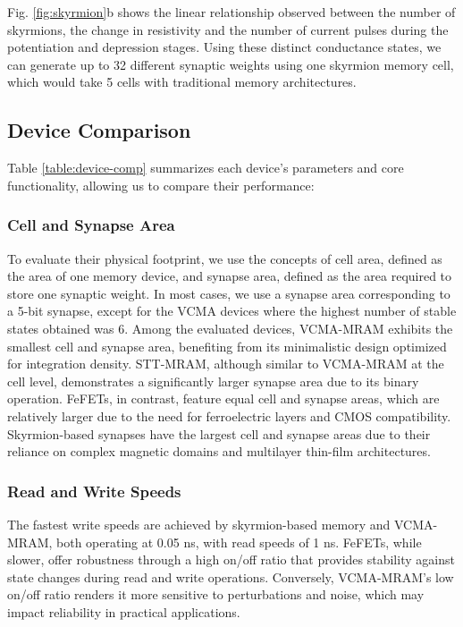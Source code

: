 \documentclass[conference]{IEEEtran}
\begin{document}
Fig. \ref{fig:skyrmion}b shows the linear relationship observed between the number of skyrmions, the change in resistivity and the number of current pulses during the potentiation and depression stages. Using these distinct conductance states, we can generate up to 32 different synaptic weights using one skyrmion memory cell, which would take 5 cells with traditional memory architectures.

\subsection{Device Comparison}

Table \ref{table:device-comp} summarizes each device's parameters and core functionality, allowing us to compare their performance:
\subsubsection{Cell and Synapse Area}
To evaluate their physical footprint, we use the concepts of cell area, defined as the area of one memory device, and synapse area, defined as the area required to store one synaptic weight. In most cases, we use a synapse area corresponding to a 5-bit synapse, except for the VCMA devices where the highest number of stable states obtained was 6. Among the evaluated devices, VCMA-MRAM exhibits the smallest cell and synapse area, benefiting from its minimalistic design optimized for integration density. STT-MRAM, although similar to VCMA-MRAM at the cell level, demonstrates a significantly larger synapse area due to its binary operation. FeFETs, in contrast, feature equal cell and synapse areas, which are relatively larger due to the need for ferroelectric layers and CMOS compatibility. Skyrmion-based synapses have the largest cell and synapse areas due to their reliance on complex magnetic domains and multilayer thin-film architectures.

\subsubsection{Read and Write Speeds}
The fastest write speeds are achieved by skyrmion-based memory and VCMA-MRAM, both operating at 0.05 ns, with read speeds of 1 ns. FeFETs, while slower, offer robustness through a high on/off ratio that provides stability against state changes during read and write operations. Conversely, VCMA-MRAM’s low on/off ratio renders it more sensitive to perturbations and noise, which may impact reliability in practical applications.
\end{document}
